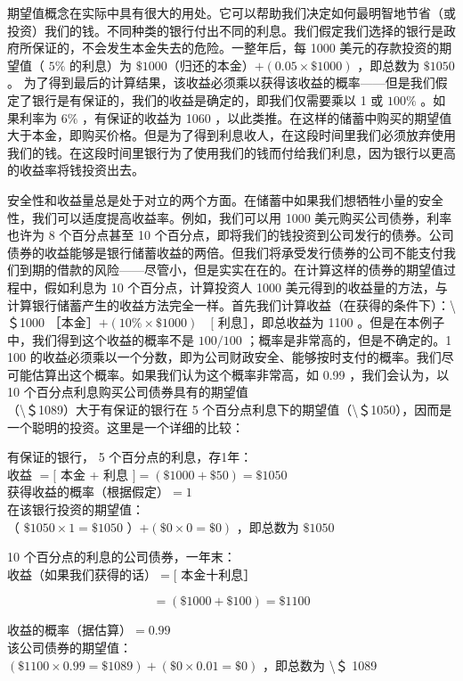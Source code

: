 期望值概念在实际中具有很大的用处。它可以帮助我们决定如何最明智地节省（或投资）我们的钱。不同种类的银行付出不同的利息。我们假定我们选择的银行是政府所保证的，不会发生本金失去的危险。一整年后，每 1000 美元的存款投资的期望值（ $5 \%$ 的利息）为 $\$ 1000$（归还的本金）$+(0.05 \times \$ 1000)$ ，即总数为 $\$ 1050$ 。 为了得到最后的计算结果，该收益必须乘以获得该收益的概率——但是我们假定了银行是有保证的，我们的收益是确定的，即我们仅需要乘以 1 或 $100 \%$ 。如果利率为 $6 \%$ ，有保证的收益为 1060 ，以此类推。在这样的储蓄中购买的期望值大于本金，即购买价格。但是为了得到利息收人，在这段时间里我们必须放弃使用我们的钱。在这段时间里银行为了使用我们的钱而付给我们利息，因为银行以更高的收益率将钱投资出去。

安全性和收益量总是处于对立的两个方面。在储蓄中如果我们想牺牲小量的安全性，我们可以适度提高收益率。例如，我们可以用 1000 美元购买公司债券，利率也许为 8 个百分点甚至 10 个百分点，即将我们的钱投资到公司发行的债券。公司债券的收益能够是银行储蓄收益的两倍。但我们将承受发行债券的公司不能支付我们到期的借款的风险——尽管小，但是实实在在的。在计算这样的债券的期望值过程中，假如利息为 10 个百分点，计算投资人 1000 美元得到的收益量的方法，与计算银行储蓄产生的收益方法完全一样。首先我们计算收益（在获得的条件下）：\textbackslash ＄1000 ［本金］$+(10 \% \times \$ 1000) \quad[$ 利息］，即总收益为 1100 。但是在本例子中，我们得到这个收益的概率不是 $100 / 100$ ；概率是非常高的，但是不确定的。1 100 的收益必须乘以一个分数，即为公司财政安全、能够按时支付的概率。我们尽可能估算出这个概率。如果我们认为这个概率非常高，如 0.99 ，我们会认为，以 10 个百分点利息购买公司债券具有的期望值\\
（\textbackslash ＄1089）大于有保证的银行在 5 个百分点利息下的期望值（\textbackslash ＄1050），因而是一个聪明的投资。这里是一个详细的比较：

有保证的银行， 5 个百分点的利息，存1年：\\
收益 $=[$ 本金 + 利息 $]=(\$ 1000+\$ 50)=\$ 1050$\\
获得收益的概率（根据假定）$=1$\\
在该银行投资的期望值：\\
（ $\$ 1050 \times 1=\$ 1050$ ）$+(\$ 0 \times 0=\$ 0)$ ，即总数为 $\$ 1050$

10 个百分点的利息的公司债券，一年末：\\
收益（如果我们获得的话）$=[$ 本金十利息］

$$
=(\$ 1000+\$ 100)=\$ 1100
$$

收益的概率（据估算）$=0.99$\\
该公司债券的期望值：\\
$(\$ 1100 \times 0.99=\$ 1089)+(\$ 0 \times 0.01=\$ 0)$ ，即总数为 \textbackslash ＄ 1089

